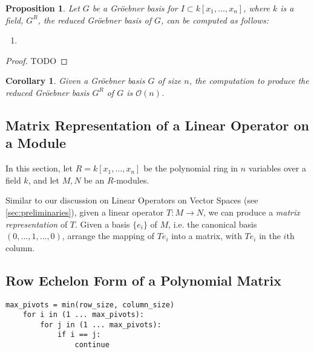 \documentclass{amsart}
\newtheorem{proposition}[theorem]{Proposition}
\newtheorem{corollary}[theorem]{Corollary}
\theoremstyle{definition}
\theoremstyle{remark}
\numberwithin{equation}{section}
\begin{document}
{

\begin{proposition}
  Let $G$ be a Gr\"oebner basis for $I \subset k[x_1, \ldots, x_n]$, where $k$ is a field, $G^R$, the reduced Gr\"oebner basis of $G$, can be computed as follows:
  \begin{enumerate}
    \item {}
  \end{enumerate}
\end{proposition}

\begin{proof}
  TODO
\end{proof}

\begin{corollary}
  Given a Gr\"oebner basis $G$ of size $n$, the computation to produce the reduced Gr\"oebner basis $G^R$ of $G$ is $\mathcal{O}(n)$. 
\end{corollary}

\subsection{Matrix Representation of a Linear Operator on a Module}

In this section, let $R = k[x_1, \ldots, x_n]$ be the polynomial ring in $n$ variables over a field $k$, and let $M, N$ be an $R$-modules.

Similar to our discussion on Linear Operators on Vector Spaces (see \cref{sec:preliminaries}), given a linear operator $T: M \to N$, we can produce a \emph{matrix representation} of $T$. Given a basis $\{ e_i \}$ of $M$, i.e. the canonical basis $(0, \ldots, 1, \ldots, 0)$, arrange the mapping of $Te_i$ into a matrix, with $Te_i$ in the $i$th column.

\begin{figure}[h]
\end{figure}

\subsection{Row Echelon Form of a Polynomial Matrix}

\begin{lstlisting}[caption=Computing the Row Echelon Form of a Polynomial Matrix]
    max_pivots = min(row_size, column_size)
    for i in (1 ... max_pivots):
        for j in (1 ... max_pivots):
            if i == j:
                continue


\end{lstlisting}}
\end{document}
